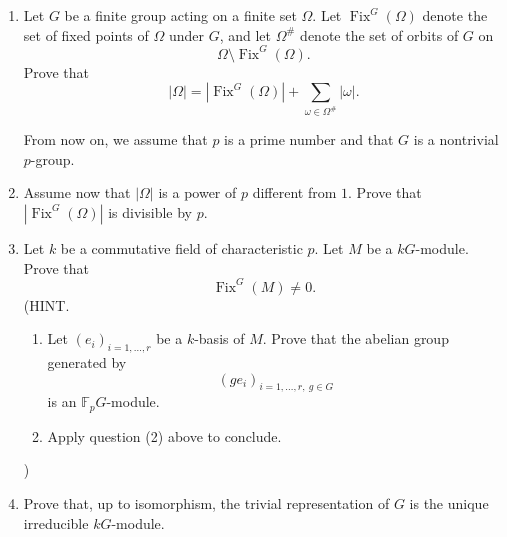 \begin{exercise}
    \begin{enumerate}
        \item[(i)] Let \(G\) be a finite group acting on a finite set \(\Omega\). Let
        \(\operatorname{Fix}^G(\Omega)\) denote the set of fixed points of \(\Omega\)
        under \(G\), and let \(\Omega^\#\) denote the set of orbits of \(G\) on
        \[
            \Omega\setminus \operatorname{Fix}^G(\Omega).
        \]
        Prove that
        \[
            |\Omega|
            =
            |\operatorname{Fix}^G(\Omega)|
            +
            \sum_{\omega\in \Omega^\#} |\omega|.
        \]

        From now on, we assume that \(p\) is a prime number and that \(G\) is a
        nontrivial \(p\)-group.

        \item[(ii)] Assume now that \(|\Omega|\) is a power of \(p\) different from \(1\).
        Prove that \(|\operatorname{Fix}^G(\Omega)|\) is divisible by \(p\).

        \item[(iii)] Let \(k\) be a commutative field of characteristic \(p\). Let \(M\)
        be a \(kG\)-module. Prove that
        \[
            \operatorname{Fix}^G(M) \neq 0.
        \]
        \textup{(HINT.} 
        \begin{enumerate}
            \item[(a)] Let \((e_i)_{i=1,\ldots,r}\) be a \(k\)-basis of \(M\).
            Prove that the abelian group generated by
            \[
                (ge_i)_{i=1,\ldots,r,\ g\in G}
            \]
            is an \(\mathbb{F}_pG\)-module.
            \item[(b)] Apply question \textup{(2)} above to conclude.
        \end{enumerate}
        \textup{)}

        \item[(iv)] Prove that, up to isomorphism, the trivial representation of \(G\)
        is the unique irreducible \(kG\)-module.
    \end{enumerate}
\end{exercise}

